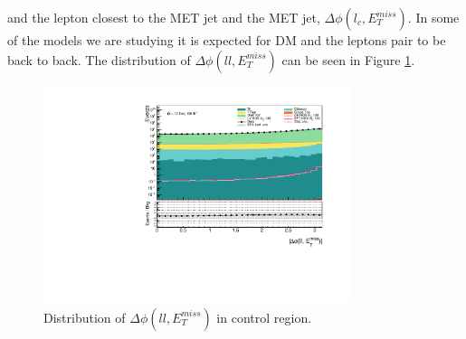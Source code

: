 \documentclass[12pt, a4paper]{book}
\begin{document}
and the lepton closest to the MET jet and the MET jet, $\Delta\phi(l_c,E_T^{miss})$. In some of the models we are studying it is expected for DM and the leptons pair to be back to back. The distribution of $\Delta\phi(ll,E_T^{miss})$ can be seen in Figure \ref{fig:dPhiLLMET_dist}.
\begin{figure}[!ht]
    \centering
        \includegraphics[width=0.8\textwidth]{dPhiLLMET.pdf}
    \caption{Distribution of $\Delta\phi(ll,E_T^{miss})$ in control region.}\label{fig:dPhiLLMET_dist}
\end{figure}
\end{document}
